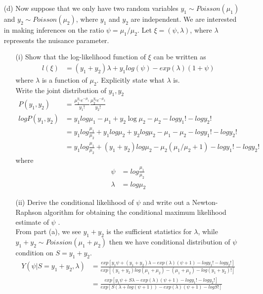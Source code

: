 \documentclass[11pt]{article} %
\begin{document}
\begin{itemize}
	\item[(d)] Now suppose that we only have two random variables $y_1 \sim Poisson(\mu_1)$ and $y_2 \sim
	Poisson(\mu_2)$, where $y_1$ and $y_2$ are independent. We are interested in making inferences on the ratio $\psi = \mu_1/\mu_2$. Let $\xi = (\psi , \lambda)$, where $\lambda$ represents the nuisance parameter.
	\begin{itemize}
		\item [(i)] Show that the log-likelihood function of $\xi$ can be written as
		\begin{align*}
			l(\xi) &= (y_1 + y_2)\lambda + y_1 log (\psi) - exp(\lambda) (1+\psi)
		\end{align*}
		where $\lambda$ is a function of $\mu_2$. Explicitly state what $\lambda$ is.\\
		Write the joint distribution of $y_1, y_2$
		\begin{align*}
			P(y_1, y_2) &= \frac{\mu_1^{y_1} e^{-\mu_1}}{y_1!} \frac{\mu_2^{y_2} e^{-\mu_2}}{y_2!} \\
			log P(y_1, y_2) &= y_1 log \mu_1 - \mu_1 + y_2 \log \mu_2 - \mu_2 - log y_1! - log y_2!\\
			&= y_1 log \frac{\mu_1}{\mu_2} + y_1 log \mu_2 + y_2 log \mu_2 -\mu_1 - \mu_2 -log y_1! - log y_2!\\
			&= y_1 log \frac{\mu_1}{\mu_2} + (y_1+y_2) log \mu_2 - \mu_2(\mu_1/\mu_2 + 1) -log y_1! - log y_2!
		\end{align*}
		where 
		\begin{align*}
			\psi &=log \frac{\mu_1}{\mu_2} \\
			\lambda &= log \mu_2
		\end{align*}
		\item[(ii)] Derive the conditional likelihood of $\psi$  and write out a Newton-Raphson algorithm for obtaining the conditional maximum likelihood estimate of $\psi$ .\\
		From part (a), we see $y_1 + y_2$ is the sufficient statistics for $\lambda$, while $y_1 + y_2 \sim Poission (\mu_1+\mu_2)$ then we have conditional distribution of $\psi$ condition on $S = y_1 + y_2$.
		\begin{align*}
			Y(\psi|S= y_1+y_2,\lambda) &= \frac{exp \left[ y_1 \psi + (y_1+y_2) \lambda - exp(\lambda)(\psi + 1) -log y_1! - log y_2! \right] }{exp \left[ (y_1+y_2) log (\mu_1+\mu_2) - (\mu_1+\mu_2) -log (y_1+y_2)!  \right]}\\
			&= \frac{exp \left[ y_1 \psi + S \lambda - exp(\lambda)(\psi + 1) -log y_1! - log y_2! \right] }{exp \left[ S (\lambda + log(\psi + 1)) -  exp(\lambda)(\psi + 1) -log S!  \right]}\\

\end{align*}
\end{itemize}
\end{itemize}
\end{document}
